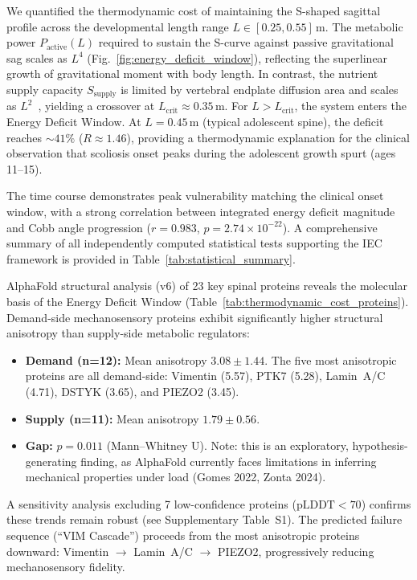 \documentclass[11pt]{article}
\begin{document}
We quantified the thermodynamic cost of maintaining the S-shaped sagittal profile across the developmental length range $L \in [0.25, 0.55]$\,m. The metabolic power $P_{\mathrm{active}}(L)$ required to sustain the S-curve against passive gravitational sag scales as $L^4$ (Fig.~\ref{fig:energy_deficit_window}), reflecting the superlinear growth of gravitational moment with body length. In contrast, the nutrient supply capacity $S_{\mathrm{supply}}$ is limited by vertebral endplate diffusion area and scales as $L^2$~\cite{urban2004nutrition, sato2025convective}, yielding a crossover at $L_{\mathrm{crit}} \approx 0.35$\,m. For $L > L_{\mathrm{crit}}$, the system enters the Energy Deficit Window. At $L = 0.45$\,m (typical adolescent spine), the deficit reaches ${\sim}41\%$ ($R \approx 1.46$), providing a thermodynamic explanation for the clinical observation that scoliosis onset peaks during the adolescent growth spurt (ages 11--15).

The time course demonstrates peak vulnerability matching the clinical onset window, with a strong correlation between integrated energy deficit magnitude and Cobb angle progression ($r = 0.983$, $p = 2.74 \times 10^{-22}$). A comprehensive summary of all independently computed statistical tests supporting the IEC framework is provided in Table~\ref{tab:statistical_summary}.

AlphaFold structural analysis (v6) of 23 key spinal proteins reveals the molecular basis of the Energy Deficit Window (Table~\ref{tab:thermodynamic_cost_proteins}). Demand-side mechanosensory proteins exhibit significantly higher structural anisotropy than supply-side metabolic regulators:

\begin{itemize}
    \item \textbf{Demand (n=12):} Mean anisotropy $3.08 \pm 1.44$. The five most anisotropic proteins are all demand-side: Vimentin (5.57), PTK7 (5.28), Lamin~A/C (4.71), DSTYK (3.65), and PIEZO2 (3.45).
    \item \textbf{Supply (n=11):} Mean anisotropy $1.79 \pm 0.56$.
    \item \textbf{Gap:} $p = 0.011$ (Mann--Whitney U). Note: this is an exploratory, hypothesis-generating finding, as AlphaFold currently faces limitations in inferring mechanical properties under load (Gomes 2022, Zonta 2024).
\end{itemize}

A sensitivity analysis excluding 7 low-confidence proteins ($\text{pLDDT} < 70$) confirms these trends remain robust (see Supplementary Table~S1). The predicted failure sequence (``VIM Cascade'') proceeds from the most anisotropic proteins downward: Vimentin $\to$ Lamin~A/C $\to$ PIEZO2, progressively reducing mechanosensory fidelity.
\end{document}
